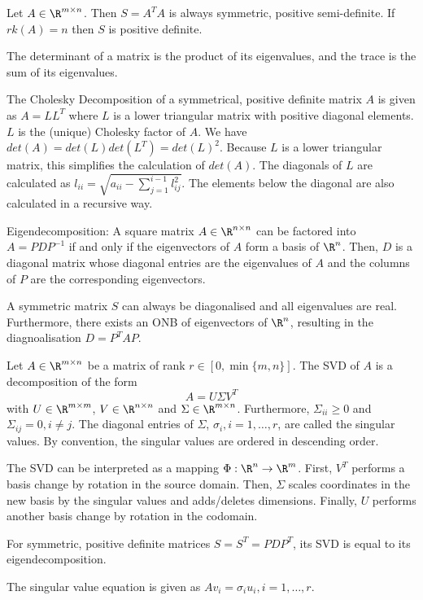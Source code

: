 Let $A \in \R^{m \times n}$.
Then $S = A^T A$ is always symmetric, positive semi-definite. If $rk(A) = n$ then $S$ is positive definite.

The determinant of a matrix is the product of its eigenvalues, and the trace is the sum of its eigenvalues.

The Cholesky Decomposition of a symmetrical, positive definite matrix $A$ is given as
$A = L L^T$ where $L$ is a lower triangular matrix with positive diagonal elements.
$L$ is the (unique) Cholesky factor of $A$.
We have $det(A) = det(L) det(L^T) = det(L)^2$.
Because $L$ is a lower triangular matrix, this simplifies the calculation of $det(A)$.
The diagonals of $L$ are calculated as
$l_{ii} = \sqrt{a_{ii} - \sum_{j = 1}^{i - 1}{l_{ij}^2}}$.
The elements below the diagonal are also calculated in a recursive way.

Eigendecomposition:
A square matrix $A \in \R^{n \times n}$ can be factored into
$A = P D P^{-1}$
if and only if the eigenvectors of $A$ form a basis of $\R^n$.
Then, $D$ is a diagonal matrix whose diagonal entries
are the eigenvalues of $A$ and the columns of $P$
are the corresponding eigenvectors.

A symmetric matrix $S$ can always be diagonalised and all eigenvalues are real.
Furthermore, there exists an ONB of eigenvectors of $\R^n$, resulting in the diagnoalisation $D = P^T A P$.

Let $A \in \R^{m \times n}$ be a matrix of rank $r \in [0, \min\{m, n\}]$.
The SVD of $A$ is a decomposition of the form
\begin{equation*}
    A = U \Sigma V^T
\end{equation*}
with $U \in \R^{m \times m}$, $V \in \R^{n \times n}$ and $\Sigma \in \R^{m \times n}$.
Furthermore, $\Sigma_{ii} \geq 0$ and $\Sigma_{ij} = 0, i \neq j$.
The diagonal entries of $\Sigma$, $\sigma_i, i = 1, \dotsc, r$, are called the singular values.
By convention, the singular values are ordered in descending order.

The SVD can be interpreted as a mapping $\Phi : \R^n \to \R^m$.
First, $V^T$ performs a basis change by rotation in the source domain.
Then, $\Sigma$ scales coordinates in the new basis by the singular values and adds/deletes dimensions.
Finally, $U$ performs another basis change by rotation in the codomain.

For symmetric, positive definite matrices $S = S^T = P D P^T$, its SVD is equal to its eigendecomposition.

The singular value equation is given as $A v_i = \sigma_i u_i, i = 1, \dotsc, r$.

